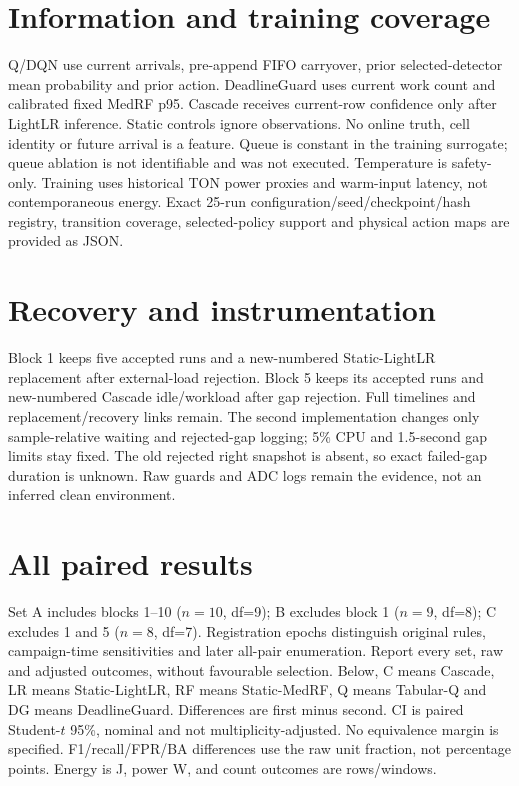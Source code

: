 \documentclass[10pt,a4paper]{article}
\begin{document}
\section{Information and training coverage}
Q/DQN use current arrivals, pre-append FIFO carryover, prior selected-detector mean probability and prior action. DeadlineGuard uses current work count and calibrated fixed MedRF p95. Cascade receives current-row confidence only after LightLR inference. Static controls ignore observations. No online truth, cell identity or future arrival is a feature. Queue is constant in the training surrogate; queue ablation is not identifiable and was not executed. Temperature is safety-only. Training uses historical TON power proxies and warm-input latency, not contemporaneous energy. Exact 25-run configuration/seed/checkpoint/hash registry, transition coverage, selected-policy support and physical action maps are provided as JSON.

\section{Recovery and instrumentation}
Block 1 keeps five accepted runs and a new-numbered Static-LightLR replacement after external-load rejection. Block 5 keeps its accepted runs and new-numbered Cascade idle/workload after gap rejection. Full timelines and replacement/recovery links remain. The second implementation changes only sample-relative waiting and rejected-gap logging; 5\% CPU and 1.5-second gap limits stay fixed. The old rejected right snapshot is absent, so exact failed-gap duration is unknown. Raw guards and ADC logs remain the evidence, not an inferred clean environment.

\section{All paired results}
\setlength{\tabcolsep}{4pt}
Set A includes blocks 1--10 ($n=10$, df=9); B excludes block 1 ($n=9$, df=8); C excludes 1 and 5 ($n=8$, df=7). Registration epochs distinguish original rules, campaign-time sensitivities and later all-pair enumeration. Report every set, raw and adjusted outcomes, without favourable selection. Below, C means Cascade, LR means Static-LightLR, RF means Static-MedRF, Q means Tabular-Q and DG means DeadlineGuard. Differences are first minus second. CI is paired Student-$t$ 95\%, nominal and not multiplicity-adjusted. No equivalence margin is specified. F1/recall/FPR/BA differences use the raw unit fraction, not percentage points. Energy is J, power W, and count outcomes are rows/windows.

\end{document}

